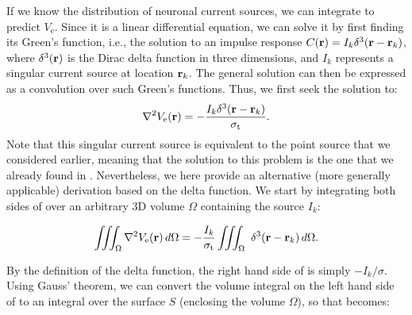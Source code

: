 If we know the distribution of neuronal current sources, 
we can integrate  to predict $V_\mathrm{e}$. 
Since it is a linear differential equation, we can solve it by first finding its Green's function, 
i.e., the solution to an impulse response $C({\bf r}) = I_k \delta^3({\bf r}-{\bf r}_k)$, 
where $\delta^3({\bf r})$ is the Dirac delta function in three dimensions, 
and $I_k$ represents a singular current source at location ${\bf r}_k$. 
The general solution can then be expressed as a convolution over such Green's functions. 
Thus, we first seek the solution to:
\begin{equation}
\nabla^2 V_\mathrm{e}({\bf r}) = - \frac{I_k \delta^3({\bf r}-{\bf r}_k)}{\sigma_\mathrm{t}}.
\label{eq:VC:CSD5}
\end{equation}
Note that this singular current source is equivalent to the point source that we considered earlier, 
meaning that the solution to this problem is the one that we already found in . 
Nevertheless, we here provide an alternative (more generally applicable) derivation based on the delta function. 
We start by integrating both sides of  over an arbitrary 3D volume $\Omega$ containing the source $I_k$:

\begin{equation}
\iiint_{\Omega} \nabla^2V_\mathrm{e}({\bf r}) \,d\Omega =  - \frac{I_k}{\sigma_\mathrm{t}} \iiint_\Omega \ \delta^3({\bf r}-{\bf r}_k) \, d\Omega.
\label{eq:VC:marit}
\end{equation}

By the definition of the delta function, the right hand side of  is simply $-I_k/\sigma$. 
Using Gauss' theorem, we can convert the volume integral on the left hand side of  
to an integral over the surface $S$ (enclosing the volume $\Omega$), 
so that  becomes:

